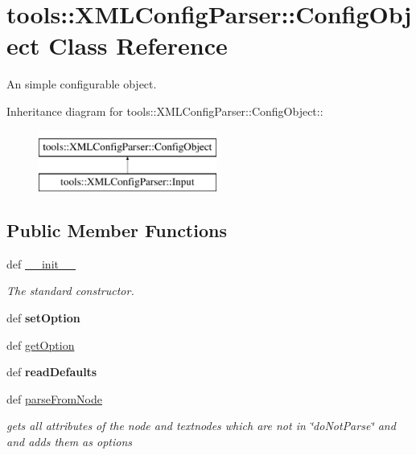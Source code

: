 \hypertarget{classtools_1_1XMLConfigParser_1_1ConfigObject}{
\section{tools::XMLConfigParser::ConfigObject Class Reference}
\label{classtools_1_1XMLConfigParser_1_1ConfigObject}
}
An simple configurable object.  


Inheritance diagram for tools::XMLConfigParser::ConfigObject::\begin{figure}[H]
\begin{center}
\leavevmode
\includegraphics[height=2cm]{classtools_1_1XMLConfigParser_1_1ConfigObject}
\end{center}
\end{figure}
\subsection*{Public Member Functions}
\begin{CompactItemize}
\item 
def \hyperlink{classtools_1_1XMLConfigParser_1_1ConfigObject_da2c248a8db2c816f489af71f314c37c}{\_\-\_\-init\_\-\_\-}
\begin{CompactList}\small\item\em The standard constructor. \item\end{CompactList}\item 
\hypertarget{classtools_1_1XMLConfigParser_1_1ConfigObject_0862df3a12f28c29566910ad410ab308}{
def \textbf{setOption}}
\label{classtools_1_1XMLConfigParser_1_1ConfigObject_0862df3a12f28c29566910ad410ab308}

\item 
def \hyperlink{classtools_1_1XMLConfigParser_1_1ConfigObject_74b01910a3f928e337b2ee658ddea97b}{getOption}
\item 
\hypertarget{classtools_1_1XMLConfigParser_1_1ConfigObject_09d996cb6905edb9b830fac3564c02aa}{
def \textbf{readDefaults}}
\label{classtools_1_1XMLConfigParser_1_1ConfigObject_09d996cb6905edb9b830fac3564c02aa}

\item 
\hypertarget{classtools_1_1XMLConfigParser_1_1ConfigObject_f6cf63837cff0257365350121dfe17bb}{
def \hyperlink{classtools_1_1XMLConfigParser_1_1ConfigObject_f6cf63837cff0257365350121dfe17bb}{parseFromNode}}
\label{classtools_1_1XMLConfigParser_1_1ConfigObject_f6cf63837cff0257365350121dfe17bb}

\begin{CompactList}\small\item\em gets all attributes of the node and textnodes which are not in \char`\"{}doNotParse\char`\"{} and and adds them as options \item\end{CompactList}\end{CompactItemize}
